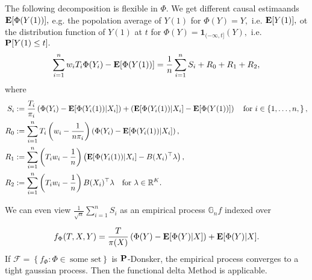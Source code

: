 The following decomposition is flexible in $\Phi.$
We get different causal estimaands $\E[\Phi(Y(1))],$
e.g.
the popolation average of $Y(1)$
for 
$
  \Phi(Y)=Y,
$
i.e.
$
\E[Y(1)]
,
$
ot the distribution function of $Y(1)$ at $t$
for 
$
  \Phi(Y)=
  \mathbf{1}_{(-\infty, t]}
  (Y)
  ,
$
i.e.
$
\P[
Y(1)\le t
]
.
$
\begin{gather}
 \sum_{i=1}^{n}  
 w_i
 T_i
 \Phi(Y_i)
  - \E [ \Phi(Y(1)) ]
  =
  \frac{1}{n}
  \sum_{ i = 1 }^{n} S_i
    + R_0
    + R_1
    + R_2
    ,
\end{gather}
where
\begin{align*}
  S_i 
  &:= 
  \frac{T_i}{\pi_i}
 \left( 
   \Phi(Y_i) - \E [ \Phi(Y_i(1)) | X_i ]
 \right)
 +
 \left( 
   \E [ \Phi(Y_i(1)) | X_i ] - \E [ \Phi(Y(1))]
 \right)
 \quad
 \text{for}\ 
 i \in \left\{ 1, \ldots, n, \right\}
 ,
 \\
  R_0
  &:=
  \sum_{ i = 1 }^{n}
  T_i
    \left(  
      w_i - \frac{1}{n \pi_i}
    \right)
 \left( 
   \Phi(Y_i) - \E [ \Phi(Y_i(1)) | X_i ]
 \right)
 ,\\
  R_1
  &:=
  \sum_{ i = 1 }^{n}
    \left(  
      T_i
      w_i - \frac{1}{n}
    \right)
 \left( 
    \E [ \Phi(Y_i(1)) | X_i ] - B(X_i)^\top \lambda
 \right)
 ,
 \\
  R_2
  &:=
  \sum_{ i = 1 }^{n}
    \left(  
      T_i
      w_i - \frac{1}{n}
    \right)
 B(X_i)^\top \lambda
 \quad 
 \text{for}
 \ 
 \lambda \in \R^K
 .
\end{align*}

We can even view
$
\frac{1}{\sqrt{n}}
\sum_{i=1}^{n}S_i 
$
as an empirical process 
$
\mathbb{G}_n f
$
indexed over 

\begin{gather}
  f_\Phi(T,X,Y)
  =
  \frac{T}{\pi(X)}
 \left( 
   \Phi(Y) - \E [ \Phi(Y) | X ]
 \right)
 +
   \E [ \Phi(Y) | X ] 
   .
\end{gather}
If $\mathcal{F}=\left\{ f_\Phi \colon \Phi \in \ \text{some set}\right\}$
is $\P$-Donsker, the empirical process converges to a tight gaussian process.
Then the functional delta Method is applicable.
